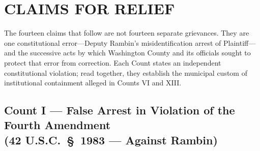 \documentclass[12pt,letterpaper]{article}
\begin{document}
	\section*{CLAIMS FOR RELIEF}
	
	\noindent The fourteen claims that follow are not fourteen separate grievances. They are one constitutional error---Deputy Rambin's misidentification arrest of Plaintiff---and the successive acts by which Washington County and its officials sought to protect that error from correction. Each Count states an independent constitutional violation; read together, they establish the municipal custom of institutional containment alleged in Counts VI and XIII.
	\subsection*{Count I --- False Arrest in Violation of the Fourth Amendment\\
		(42 U.S.C.\ \S\ 1983 --- Against Rambin)}
\end{document}
